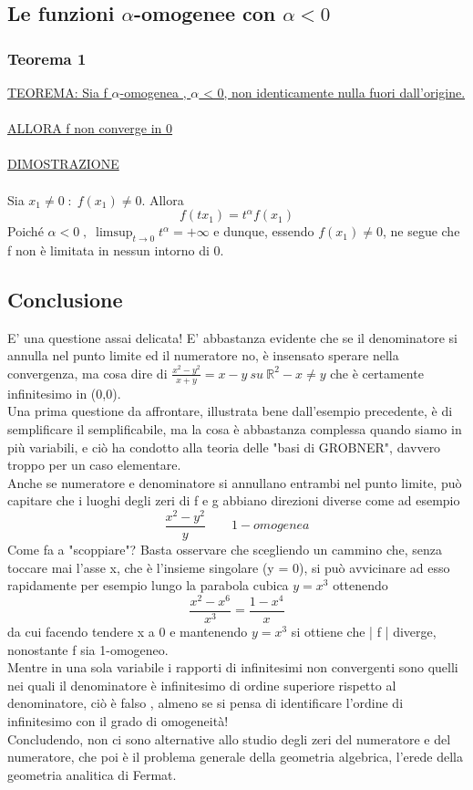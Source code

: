 \documentclass[fontsize = 20px, paper = a4]{article}
\begin{document}
\subsection{Le funzioni $\alpha$-omogenee con $\alpha < 0$}
\subsubsection{Teorema 1}
\underline{TEOREMA: Sia f $\alpha$-omogenea , $\alpha$ < 0, non identicamente nulla fuori dall'origine.}\\ \\
\underline{ALLORA f non converge in 0} \\ \\
\underline{DIMOSTRAZIONE} \\ \\
Sia $x_1 \neq 0 \; : \; f(x_1) \neq 0$. Allora 
$$f(tx_1) =  t^\alpha f(x_1)$$
Poiché $\alpha < 0 \; , \; \limsup_{t \to 0}t^\alpha = +\infty$ e dunque, essendo $f(x_1) \neq 0$, ne segue che f non è limitata in nessun intorno  di 0. 
\subsection{Conclusione}
E' una questione assai delicata! E' abbastanza evidente che se il denominatore si annulla nel punto limite ed il numeratore no, è insensato sperare nella convergenza, ma cosa dire di $\frac{x^2 - y^2}{x + y} = x-y \ su \ \mathbb{R}^2 - {x \neq y}$ che è certamente infinitesimo in (0,0). \\
Una prima questione da affrontare, illustrata bene dall'esempio precedente, è di semplificare il semplificabile, ma la cosa è abbastanza complessa quando siamo in più variabili, e ciò ha condotto alla teoria delle "basi di GROBNER", davvero troppo per un caso elementare. \\
Anche se numeratore e denominatore si annullano entrambi nel punto limite, può capitare che i luoghi degli zeri di f e g abbiano direzioni diverse come ad esempio
$$\frac{x^2 - y^2}{y} \qquad 1-omogenea$$
Come fa a "scoppiare"? Basta osservare che scegliendo un cammino che, senza toccare mai l'asse x, che è l'insieme singolare (y = 0), si può avvicinare ad esso rapidamente per esempio lungo la parabola cubica $y = x^3$ ottenendo
$$\frac{x^2 - x^6}{x^3} = \frac{1 - x^4}{x}$$
da cui facendo tendere x a 0 e mantenendo $y = x^3$ si ottiene che | f | diverge, nonostante f sia 1-omogeneo. \\
Mentre in una sola variabile i rapporti di infinitesimi non convergenti sono quelli nei quali il denominatore è infinitesimo di ordine superiore rispetto al denominatore, ciò è falso , almeno se si pensa di identificare l'ordine di infinitesimo con il grado di omogeneità! \\
Concludendo, non ci sono alternative allo studio degli zeri del numeratore e del numeratore, che poi è il problema generale della geometria algebrica, l'erede della geometria analitica di Fermat.
\end{document}
